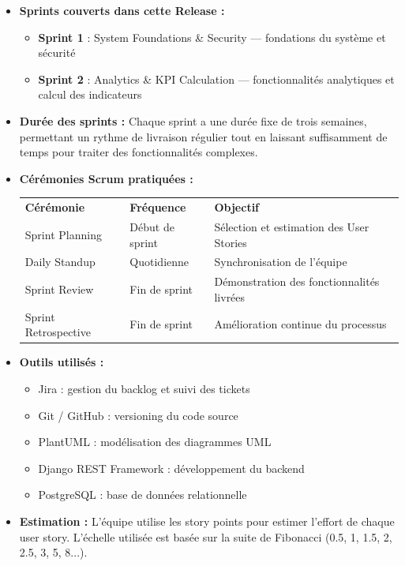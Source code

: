 \documentclass[a4paper,12pt]{report}
\begin{document}
\begin{itemize}
    \item \textbf{Sprints couverts dans cette Release :}
    \begin{itemize}
        \item \textbf{Sprint 1} : System Foundations \& Security — fondations du système et sécurité
        \item \textbf{Sprint 2} : Analytics \& KPI Calculation — fonctionnalités analytiques et calcul des indicateurs
    \end{itemize}
    \item \textbf{Durée des sprints :} Chaque sprint a une durée fixe de trois semaines, permettant un rythme de livraison régulier tout en laissant suffisamment de temps pour traiter des fonctionnalités complexes.
    \item \textbf{Cérémonies Scrum pratiquées :}
    
    \begin{tabular}{l l l}
        \textbf{Cérémonie} & \textbf{Fréquence} & \textbf{Objectif} \\
        Sprint Planning & Début de sprint & Sélection et estimation des User Stories \\
        Daily Standup & Quotidienne & Synchronisation de l'équipe \\
        Sprint Review & Fin de sprint & Démonstration des fonctionnalités livrées \\
        Sprint Retrospective & Fin de sprint & Amélioration continue du processus
    \end{tabular}
    \item \textbf{Outils utilisés :}
    \begin{itemize}
        \item Jira : gestion du backlog et suivi des tickets
        \item Git / GitHub : versioning du code source
        \item PlantUML : modélisation des diagrammes UML
        \item Django REST Framework\cite{djangorestframework} : développement du backend
        \item PostgreSQL : base de données relationnelle
    \end{itemize}
    \item \textbf{Estimation :} L'équipe utilise les story points pour estimer l'effort de chaque user story. L'échelle utilisée est basée sur la suite de Fibonacci (0.5, 1, 1.5, 2, 2.5, 3, 5, 8...).
\end{itemize}
\end{document}
